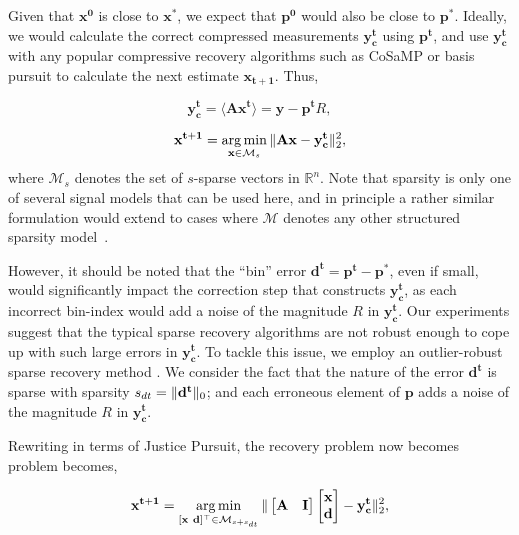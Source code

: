 Given that $\mathbf{x^0}$ is close to $\mathbf{x^*}$, we expect that $\mathbf{p^0}$ would also be close to $\mathbf{p^*}$. Ideally, we would calculate the correct compressed measurements $\mathbf{y^t_c}$ using $\mathbf{p^t}$, and use $\mathbf{y^t_c}$ with any popular compressive recovery algorithms such as CoSaMP or basis pursuit to calculate the next estimate $\mathbf{{x}_{t+1}}$. Thus,

$$
\mathbf{y^t_c} = \langle \mathbf{A}\mathbf{x^{t}} \rangle = \mathbf{y} - \mathbf{p^t}R,
$$

$$
\mathbf{{x}^{t+1}} = \argmin_{\mathbf{x} \in \mathcal{M}_s}\norm{\mathbf{Ax} - \mathbf{y^t_c}}_2^2, %
$$
where $\mathcal{M}_s$ denotes the set of $s$-sparse vectors in $\mathbb{R}^n$. Note that sparsity is only one of several signal models that can be used here, and in principle a rather similar formulation would extend to cases where $\mathcal{M}$ denotes any other structured sparsity model~\cite{modelcs}.

However, it should be noted that the ``bin'' error $\mathbf{d^t} = \mathbf{p^t - p^*}$, even if small, would significantly impact the correction step that constructs $\mathbf{y^t_c}$, as each incorrect bin-index would add a noise of the magnitude $R$ in $\mathbf{y^t_c}$. Our experiments suggest that the typical sparse recovery algorithms are not robust enough to cope up with such large errors in $\mathbf{y^t_c}$. To tackle this issue, we employ an outlier-robust sparse recovery method \cite{Laska2009}. We consider the fact that the nature of the error $\mathbf{d^t}$ is sparse with sparsity $s_{dt}=\|\mathbf{d^t}\|_0$; and each erroneous element of $\mathbf{p}$ adds a noise of the magnitude $R$ in $\mathbf{y^t_c}$.

Rewriting in terms of Justice Pursuit, the recovery problem now becomes problem becomes,

$$
\mathbf{{x}^{t+1}}=\argmin_{[\mathbf{x~d}]^\t \in \mathcal{M}_{s+s_{dt}}}\norm{\begin{bmatrix} \mathbf{A} & \mathbf{I} \end{bmatrix} \begin{bmatrix} \mathbf{x} \\ \mathbf{d} \end{bmatrix} - \mathbf{y^t_c}}_2^2, %
$$

